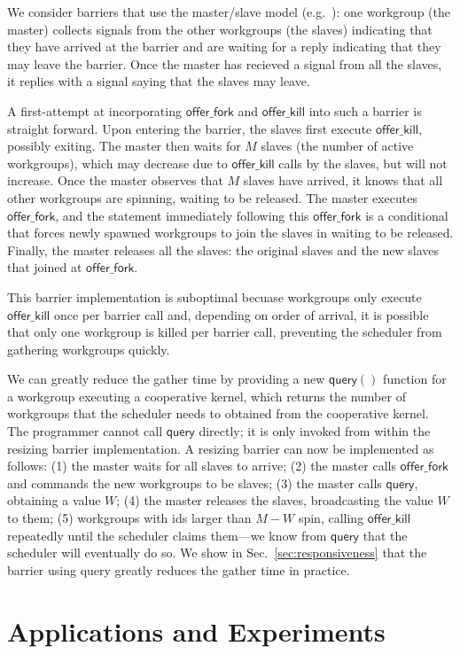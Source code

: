 \documentclass[numbers,nocopyrightspace,10pt]{sigplanconf}
\newcommand{\mysec}{Sec.~}
\newcommand{\offerfork}{\mathsf{offer\_fork}}
\newcommand{\offerkill}{\mathsf{offer\_kill}}
\newcommand{\keyword}[1]{\mathsf{#1}}
\begin{document}
We consider barriers that use the master/slave model
(e.g.\ \cite{XF10}): one workgroup (the master) collects signals
from the other workgroups (the slaves) indicating that they have
arrived at the barrier and are waiting for a reply indicating that
they may leave the barrier. Once the master has recieved a signal from
all the slaves, it replies with a signal saying that the slaves may
leave. 

A first-attempt at incorporating $\offerfork$ and $\offerkill$ into
such a barrier is straight forward. Upon entering the barrier, the
slaves first execute $\offerkill$, possibly exiting. The master then
waits for $M$ slaves (the number of active workgroups), which may
decrease due to $\offerkill$ calls by the
slaves, but will not increase. Once the master observes that $M$ slaves
have arrived, it knows that all other workgroups are spinning, waiting to be released. The master executes $\offerfork$,
and the statement immediately following this $\offerfork$ is a conditional that forces newly spawned workgroups to join the
slaves in waiting to be released. Finally, the master
releases all the slaves: the original slaves and the new slaves that
joined at $\offerfork$.

This barrier implementation is suboptimal becuase workgroups only
execute $\offerkill$ once per barrier call and, depending on
order of arrival, it is possible
that only one workgroup is killed per barrier call, preventing the scheduler from gathering workgroups quickly.

We can greatly reduce the gather time by providing a new $\keyword{query}()$
function for a workgroup executing a cooperative kernel, which returns the number of workgroups that the scheduler needs to obtained
from the cooperative kernel.  
%
The programmer cannot call $\keyword{query}$ directly;
it is only invoked from within the resizing barrier implementation.
%
A resizing barrier can now be implemented
as follows: (1) the master waits for all slaves to arrive; (2) the master calls $\offerfork$ and
commands the new workgroups to be slaves; (3) the master calls $\keyword{query}$, obtaining a value $W$;
(4) the master releases the slaves, broadcasting the value $W$ to them; (5) workgroups with ids larger than $M-W$ spin, calling 
$\offerkill$ repeatedly until the scheduler claims them---we know from $\keyword{query}$ that the scheduler will eventually do so.
We show in \mysec\ref{sec:responsiveness} that the barrier using
query greatly reduces the gather time in practice.


\section{Applications and Experiments}\label{sec:experiments}
\end{document}
